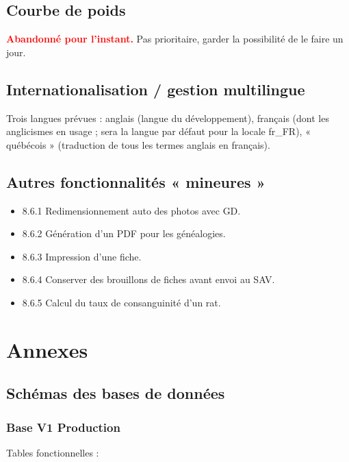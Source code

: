 ﻿\documentclass[a4paper,10pt]{article}
\newcommand\desire[1]{\noindent\textbf{\textcolor{red}{#1}}}
\begin{document}
\subsection{Courbe de poids}
\desire{Abandonné pour l'instant.} Pas prioritaire, garder la possibilité de le faire un jour.

\subsection{Internationalisation / gestion multilingue}
Trois langues prévues : anglais (langue du développement), français (dont les anglicismes en usage ; sera la langue par défaut pour la locale fr\_FR), « québécois » (traduction de tous les termes anglais en français).  

\subsection{Autres fonctionnalités « mineures »}
\begin{itemize}
\item 8.6.1 Redimensionnement auto des photos avec GD.
\item 8.6.2 Génération d'un PDF pour les généalogies.
\item 8.6.3 Impression d'une fiche.
\item 8.6.4 Conserver des brouillons de fiches avant envoi au SAV.
\item 8.6.5 Calcul du taux de consanguinité d'un rat.
\end{itemize}

\newpage
\appendix
\setlength{\parskip}{0pt}
\section{Annexes}

\subsection{Schémas des bases de données}

\subsubsection{Base V1 Production}
\label{app:dbv1}
Tables fonctionnelles :
\end{document}
